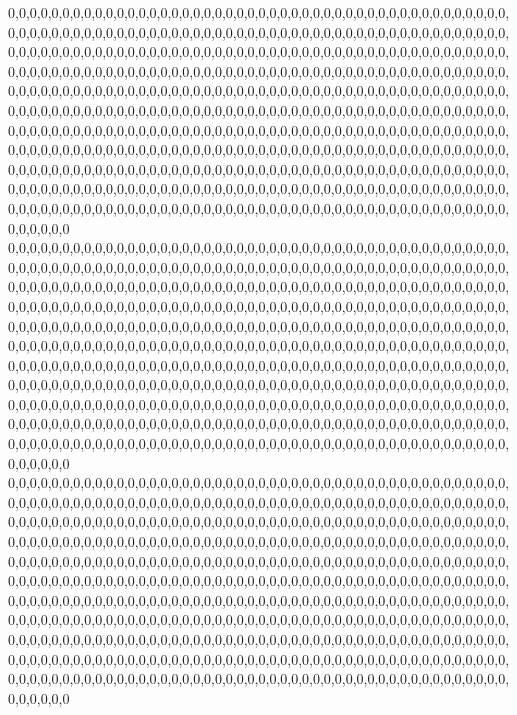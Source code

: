 0,0,0,0,0,0,0,0,0,0,0,0,0,0,0,0,0,0,0,0,0,0,0,0,0,0,0,0,0,0,0,0,0,0,0,0,0,0,0,0,0,0,0,0,0,0,0,0,0,0,0,0,0,0,0,0,0,0,0,0,0,0,0,0,0,0,0,0,0,0,0,0,0,0,0,0,0,0,0,0,0,0,0,0,0,0,0,0,0,0,0,0,0,0,0,0,0,0,0,0,0,0,0,0,0,0,0,0,0,0,0,0,0,0,0,0,0,0,0,0,0,0,0,0,0,0,0,0,0,0,0,0,0,0,0,0,0,0,0,0,0,0,0,0,0,0,0,0,0,0,0,0,0,0,0,0,0,0,0,0,0,0,0,0,0,0,0,0,0,0,0,0,0,0,0,0,0,0,0,0,0,0,0,0,0,0,0,0,0,0,0,0,0,0,0,0,0,0,0,0,0,0,0,0,0,0,0,0,0,0,0,0,0,0,0,0,0,0,0,0,0,0,0,0,0,0,0,0,0,0,0,0,0,0,0,0,0,0,0,0,0,0,0,0,0,0,0,0,0,0,0,0,0,0,0,0,0,0,0,0,0,0,0,0,0,0,0,0,0,0,0,0,0,0,0,0,0,0,0,0,0,0,0,0,0,0,0,0,0,0,0,0,0,0,0,0,0,0,0,0,0,0,0,0,0,0,0,0,0,0,0,0,0,0,0,0,0,0,0,0,0,0,0,0,0,0,0,0,0,0,0,0,0,0,0,0,0,0,0,0,0,0,0,0,0,0,0,0,0,0,0,0,0,0,0,0,0,0,0,0,0,0,0,0,0,0,0,0,0,0,0,0,0,0,0,0,0,0,0,0,0,0,0,0,0,0,0,0,0,0,0,0,0,0,0,0,0,0,0,0,0,0,0,0,0,0,0,0,0,0,0,0,0,0,0,0,0,0,0,0,0,0,0,0,0,0,0,0,0,0,0,0,0,0,0,0,0,0,0,0,0,0,0,0,0,0,0,0,0,0,0,0,0,0,0,0,0,0,0,0,0,0,0,0,0,0,0,0,0,0,0,0,0,0,0,0,0,0,0,0,0,0,0,0,0,0,0,0,0,0,0,0,0,0,0,0,0,0,0,0,0,0,0,0,0,0,0,0,0,0,0,0
0,0,0,0,0,0,0,0,0,0,0,0,0,0,0,0,0,0,0,0,0,0,0,0,0,0,0,0,0,0,0,0,0,0,0,0,0,0,0,0,0,0,0,0,0,0,0,0,0,0,0,0,0,0,0,0,0,0,0,0,0,0,0,0,0,0,0,0,0,0,0,0,0,0,0,0,0,0,0,0,0,0,0,0,0,0,0,0,0,0,0,0,0,0,0,0,0,0,0,0,0,0,0,0,0,0,0,0,0,0,0,0,0,0,0,0,0,0,0,0,0,0,0,0,0,0,0,0,0,0,0,0,0,0,0,0,0,0,0,0,0,0,0,0,0,0,0,0,0,0,0,0,0,0,0,0,0,0,0,0,0,0,0,0,0,0,0,0,0,0,0,0,0,0,0,0,0,0,0,0,0,0,0,0,0,0,0,0,0,0,0,0,0,0,0,0,0,0,0,0,0,0,0,0,0,0,0,0,0,0,0,0,0,0,0,0,0,0,0,0,0,0,0,0,0,0,0,0,0,0,0,0,0,0,0,0,0,0,0,0,0,0,0,0,0,0,0,0,0,0,0,0,0,0,0,0,0,0,0,0,0,0,0,0,0,0,0,0,0,0,0,0,0,0,0,0,0,0,0,0,0,0,0,0,0,0,0,0,0,0,0,0,0,0,0,0,0,0,0,0,0,0,0,0,0,0,0,0,0,0,0,0,0,0,0,0,0,0,0,0,0,0,0,0,0,0,0,0,0,0,0,0,0,0,0,0,0,0,0,0,0,0,0,0,0,0,0,0,0,0,0,0,0,0,0,0,0,0,0,0,0,0,0,0,0,0,0,0,0,0,0,0,0,0,0,0,0,0,0,0,0,0,0,0,0,0,0,0,0,0,0,0,0,0,0,0,0,0,0,0,0,0,0,0,0,0,0,0,0,0,0,0,0,0,0,0,0,0,0,0,0,0,0,0,0,0,0,0,0,0,0,0,0,0,0,0,0,0,0,0,0,0,0,0,0,0,0,0,0,0,0,0,0,0,0,0,0,0,0,0,0,0,0,0,0,0,0,0,0,0,0,0,0,0,0,0,0,0,0,0,0,0,0,0,0,0,0,0,0,0,0,0,0,0,0,0,0,0,0,0,0,0,0,0,0,0,0,0,0,0,0,0
0,0,0,0,0,0,0,0,0,0,0,0,0,0,0,0,0,0,0,0,0,0,0,0,0,0,0,0,0,0,0,0,0,0,0,0,0,0,0,0,0,0,0,0,0,0,0,0,0,0,0,0,0,0,0,0,0,0,0,0,0,0,0,0,0,0,0,0,0,0,0,0,0,0,0,0,0,0,0,0,0,0,0,0,0,0,0,0,0,0,0,0,0,0,0,0,0,0,0,0,0,0,0,0,0,0,0,0,0,0,0,0,0,0,0,0,0,0,0,0,0,0,0,0,0,0,0,0,0,0,0,0,0,0,0,0,0,0,0,0,0,0,0,0,0,0,0,0,0,0,0,0,0,0,0,0,0,0,0,0,0,0,0,0,0,0,0,0,0,0,0,0,0,0,0,0,0,0,0,0,0,0,0,0,0,0,0,0,0,0,0,0,0,0,0,0,0,0,0,0,0,0,0,0,0,0,0,0,0,0,0,0,0,0,0,0,0,0,0,0,0,0,0,0,0,0,0,0,0,0,0,0,0,0,0,0,0,0,0,0,0,0,0,0,0,0,0,0,0,0,0,0,0,0,0,0,0,0,0,0,0,0,0,0,0,0,0,0,0,0,0,0,0,0,0,0,0,0,0,0,0,0,0,0,0,0,0,0,0,0,0,0,0,0,0,0,0,0,0,0,0,0,0,0,0,0,0,0,0,0,0,0,0,0,0,0,0,0,0,0,0,0,0,0,0,0,0,0,0,0,0,0,0,0,0,0,0,0,0,0,0,0,0,0,0,0,0,0,0,0,0,0,0,0,0,0,0,0,0,0,0,0,0,0,0,0,0,0,0,0,0,0,0,0,0,0,0,0,0,0,0,0,0,0,0,0,0,0,0,0,0,0,0,0,0,0,0,0,0,0,0,0,0,0,0,0,0,0,0,0,0,0,0,0,0,0,0,0,0,0,0,0,0,0,0,0,0,0,0,0,0,0,0,0,0,0,0,0,0,0,0,0,0,0,0,0,0,0,0,0,0,0,0,0,0,0,0,0,0,0,0,0,0,0,0,0,0,0,0,0,0,0,0,0,0,0,0,0,0,0,0,0,0,0,0,0,0,0,0,0,0,0,0,0,0,0,0,0,0,0,0,0,0,0,0,0,0,0,0,0,0,0
